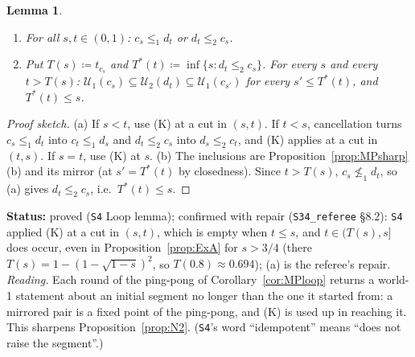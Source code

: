 \documentclass[11pt]{article}
\newtheorem{lemma}[theorem]{Lemma}
\theoremstyle{definition}
\theoremstyle{remark}
\newcommand{\src}[1]{\texttt{#1}}
\newcommand{\status}[1]{\par\smallskip\noindent\textbf{Status:} #1\par\smallskip}
\begin{document}
\begin{lemma}\label{lem:loop}
\begin{enumerate}[leftmargin=*,label=(\alph*)]
\item For all $s,t\in(0,1)$: $c_s\le_1d_t$ or $d_t\le_2c_s$.
\item Put $T(s)\coloneqq t_{c_s}$ and $T^*(t)\coloneqq\inf\{s:d_t\le_2c_s\}$. For every $s$ and every $t>T(s)$: $\mathcal U_1(c_s)\subseteq\mathcal U_2(d_t)\subseteq\mathcal U_1(c_{s'})$ for every $s'\le T^*(t)$, and $T^*(t)\le s$.
\end{enumerate}
\end{lemma}
\begin{proof}[Proof sketch]
(a) If $s<t$, use (K) at a cut in $(s,t)$. If $t<s$, cancellation turns $c_s\le_1d_t$ into $c_t\le_1d_s$ and $d_t\le_2c_s$ into $d_s\le_2c_t$, and (K) applies at a cut in $(t,s)$. If $s=t$, use (K) at $s$. (b) The inclusions are Proposition~\ref{prop:MPsharp}(b) and its mirror (at $s'=T^*(t)$ by closedness). Since $t>T(s)$, $c_s\not\le_1d_t$, so (a) gives $d_t\le_2c_s$, i.e.\ $T^*(t)\le s$.
\end{proof}
\status{proved (\src{S4} Loop lemma); confirmed with repair (\src{S34\_referee} \S8.2): \src{S4} applied (K) at a cut in $(s,t)$, which is empty when $t\le s$, and $t\in(T(s),s]$ does occur, even in Proposition~\ref{prop:ExA} for $s>3/4$ (there $T(s)=1-(1-\sqrt{1-s})^2$, so $T(0.8)\approx0.694$); (a) is the referee's repair. \emph{Reading.} Each round of the ping-pong of Corollary~\ref{cor:MPloop} returns a world-1 statement about an initial segment no longer than the one it started from: a mirrored pair is a fixed point of the ping-pong, and (K) is used up in reaching it. This sharpens Proposition~\ref{prop:N2}. (\src{S4}'s word ``idempotent'' means ``does not raise the segment''.)}
\end{document}
